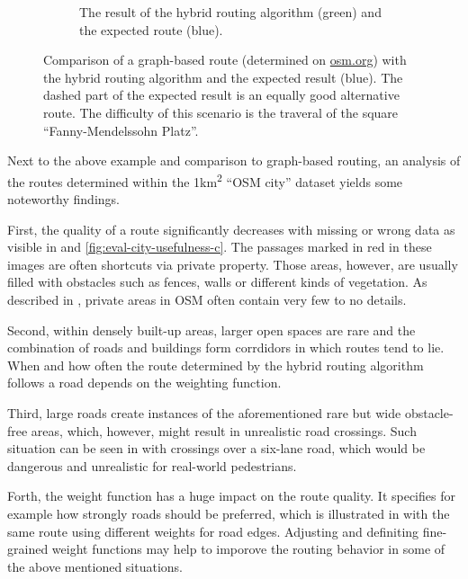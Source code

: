 \begin{figure}[h!]
\begin{minipage}[t]{.48\textwidth}
\begin{subfigure}[t]{\linewidth}
\begin{figcenter}
						\end{figcenter}
						\caption{The result of the hybrid routing algorithm (green) and the expected route (blue).}
						\label{fig:eval-osterstrasse-actual-expected}
					\end{subfigure}
				\end{minipage}
				\caption{Comparison of a graph-based route (determined on \href{https://www.openstreetmap.org/directions?engine=fossgis\_osrm\_foot\&route=53.57657\%2C9.95210\%3B53.57601\%2C9.95268\#map=19/53.57632/9.95218}{osm.org}) with the hybrid routing algorithm and the expected result (blue). The dashed part of the expected result is an equally good alternative route. The difficulty of this scenario is the traveral of the square \enquote{Fanny-Mendelssohn Platz}.}
				\label{fig:eval-osterstrasse}
			\end{figure}
			
			Next to the above example and comparison to graph-based routing, an analysis of the routes determined within the 1km\textsuperscript{2} \enquote{OSM city} dataset yields some noteworthy findings.
			
			First, the quality of a route significantly decreases with missing or wrong data as visible in  and \ref{fig:eval-city-usefulness-c}.
			The passages marked in red in these images are often shortcuts via private property.
			Those areas, however, are usually filled with obstacles such as fences, walls or different kinds of vegetation.
			As described in , private areas in OSM often contain very few to no details.
			
			Second, within densely built-up areas, larger open spaces are rare and the combination of roads and buildings form corrdidors in which routes tend to lie.
			When and how often the route determined by the hybrid routing algorithm follows a road depends on the weighting function.
			
			Third, large roads create instances of the aforementioned rare but wide obstacle-free areas, which, however, might result in unrealistic road crossings.
			Such situation can be seen in  with crossings over a six-lane road, which would be dangerous and unrealistic for real-world pedestrians.
			
			Forth, the weight function has a huge impact on the route quality.
			It specifies for example how strongly roads should be preferred, which is illustrated in  with the same route using different weights for road edges.
			Adjusting and definiting fine-grained weight functions may help to imporove the routing behavior in some of the above mentioned situations.
			
